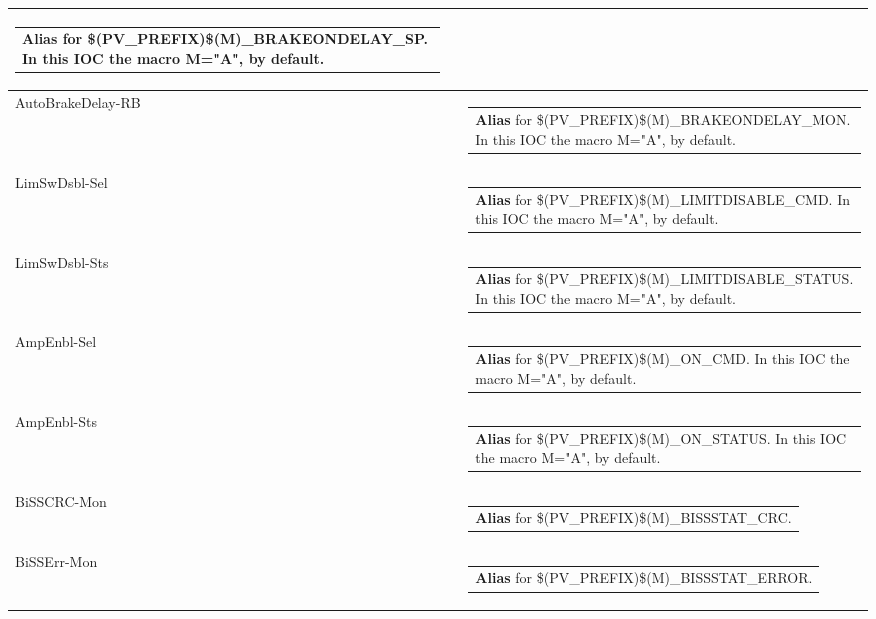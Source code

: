 \documentclass[openany]{article}
\begin{document}
\begin{longtable}{| m{4.5cm} m{2.5cm}  m{8.0cm} |}
\begin{tabular}{@{}m{6cm}@{}}
                \textbf{Alias} for \$(PV\_PREFIX)\$(M)\_BRAKEONDELAY\_SP. In this IOC the macro M="A", by default.
            \end{tabular} \hypertarget{}{}\\ \hline
        AutoBrakeDelay-RB &  & \begin{tabular}{@{}m{6cm}@{}}
                \textbf{Alias} for \$(PV\_PREFIX)\$(M)\_BRAKEONDELAY\_MON. In this IOC the macro M="A", by default.
            \end{tabular} \hypertarget{}{}\\ \hline
        LimSwDsbl-Sel &  & \begin{tabular}{@{}m{6cm}@{}}
                \textbf{Alias} for \$(PV\_PREFIX)\$(M)\_LIMITDISABLE\_CMD. In this IOC the macro M="A", by default.
            \end{tabular} \hypertarget{}{}\\ \hline
        LimSwDsbl-Sts &  & \begin{tabular}{@{}m{6cm}@{}}
                \textbf{Alias} for \$(PV\_PREFIX)\$(M)\_LIMITDISABLE\_STATUS. In this IOC the macro M="A", by default.
            \end{tabular} \hypertarget{}{}\\ \hline
        AmpEnbl-Sel &  & \begin{tabular}{@{}m{6cm}@{}}
                \textbf{Alias} for \$(PV\_PREFIX)\$(M)\_ON\_CMD. In this IOC the macro M="A", by default.
            \end{tabular} \hypertarget{}{}\\ \hline
        AmpEnbl-Sts &  & \begin{tabular}{@{}m{6cm}@{}}
                \textbf{Alias} for \$(PV\_PREFIX)\$(M)\_ON\_STATUS. In this IOC the macro M="A", by default.
            \end{tabular} \hypertarget{}{}\\ \hline
        BiSSCRC-Mon &  & \begin{tabular}{@{}m{6cm}@{}}
                \textbf{Alias} for \$(PV\_PREFIX)\$(M)\_BISSSTAT\_CRC.
            \end{tabular} \hypertarget{}{}\\ \hline
        BiSSErr-Mon &  & \begin{tabular}{@{}m{6cm}@{}}
                \textbf{Alias} for \$(PV\_PREFIX)\$(M)\_BISSSTAT\_ERROR.
            \end{tabular} \hypertarget{}{}\\ \hline

\end{longtable}
\end{document}
